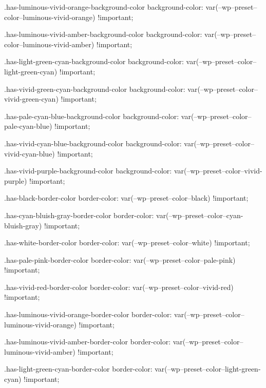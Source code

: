         .has-luminous-vivid-orange-background-color {
            background-color: var(--wp--preset--color--luminous-vivid-orange) !important;
        }

        .has-luminous-vivid-amber-background-color {
            background-color: var(--wp--preset--color--luminous-vivid-amber) !important;
        }

        .has-light-green-cyan-background-color {
            background-color: var(--wp--preset--color--light-green-cyan) !important;
        }

        .has-vivid-green-cyan-background-color {
            background-color: var(--wp--preset--color--vivid-green-cyan) !important;
        }

        .has-pale-cyan-blue-background-color {
            background-color: var(--wp--preset--color--pale-cyan-blue) !important;
        }

        .has-vivid-cyan-blue-background-color {
            background-color: var(--wp--preset--color--vivid-cyan-blue) !important;
        }

        .has-vivid-purple-background-color {
            background-color: var(--wp--preset--color--vivid-purple) !important;
        }

        .has-black-border-color {
            border-color: var(--wp--preset--color--black) !important;
        }

        .has-cyan-bluish-gray-border-color {
            border-color: var(--wp--preset--color--cyan-bluish-gray) !important;
        }

        .has-white-border-color {
            border-color: var(--wp--preset--color--white) !important;
        }

        .has-pale-pink-border-color {
            border-color: var(--wp--preset--color--pale-pink) !important;
        }

        .has-vivid-red-border-color {
            border-color: var(--wp--preset--color--vivid-red) !important;
        }

        .has-luminous-vivid-orange-border-color {
            border-color: var(--wp--preset--color--luminous-vivid-orange) !important;
        }

        .has-luminous-vivid-amber-border-color {
            border-color: var(--wp--preset--color--luminous-vivid-amber) !important;
        }

        .has-light-green-cyan-border-color {
            border-color: var(--wp--preset--color--light-green-cyan) !important;
        }

